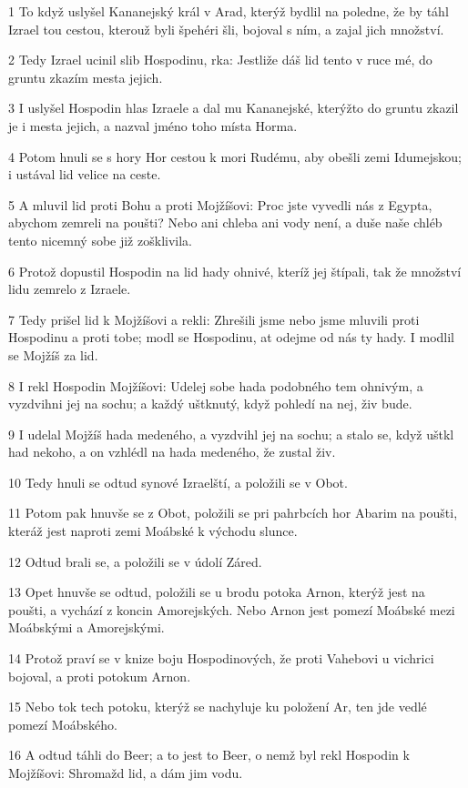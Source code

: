 \par 1 To když uslyšel Kananejský král v Arad, kterýž bydlil na poledne, že by táhl Izrael tou cestou, kterouž byli špehéri šli, bojoval s ním, a zajal jich množství.
\par 2 Tedy Izrael ucinil slib Hospodinu, rka: Jestliže dáš lid tento v ruce mé, do gruntu zkazím mesta jejich.
\par 3 I uslyšel Hospodin hlas Izraele a dal mu Kananejské, kterýžto do gruntu zkazil je i mesta jejich, a nazval jméno toho místa Horma.
\par 4 Potom hnuli se s hory Hor cestou k mori Rudému, aby obešli zemi Idumejskou; i ustával lid velice na ceste.
\par 5 A mluvil lid proti Bohu a proti Mojžíšovi: Proc jste vyvedli nás z Egypta, abychom zemreli na poušti? Nebo ani chleba ani vody není, a duše naše chléb tento nicemný sobe již zošklivila.
\par 6 Protož dopustil Hospodin na lid hady ohnivé, kteríž jej štípali, tak že množství lidu zemrelo z Izraele.
\par 7 Tedy prišel lid k Mojžíšovi a rekli: Zhrešili jsme nebo jsme mluvili proti Hospodinu a proti tobe; modl se Hospodinu, at odejme od nás ty hady. I modlil se Mojžíš za lid.
\par 8 I rekl Hospodin Mojžíšovi: Udelej sobe hada podobného tem ohnivým, a vyzdvihni jej na sochu; a každý uštknutý, když pohledí na nej, živ bude.
\par 9 I udelal Mojžíš hada medeného, a vyzdvihl jej na sochu; a stalo se, když uštkl had nekoho, a on vzhlédl na hada medeného, že zustal živ.
\par 10 Tedy hnuli se odtud synové Izraelští, a položili se v Obot.
\par 11 Potom pak hnuvše se z Obot, položili se pri pahrbcích hor Abarim na poušti, kteráž jest naproti zemi Moábské k východu slunce.
\par 12 Odtud brali se, a položili se v údolí Záred.
\par 13 Opet hnuvše se odtud, položili se u brodu potoka Arnon, kterýž jest na poušti, a vychází z koncin Amorejských. Nebo Arnon jest pomezí Moábské mezi Moábskými a Amorejskými.
\par 14 Protož praví se v knize boju Hospodinových, že proti Vahebovi u vichrici bojoval, a proti potokum Arnon.
\par 15 Nebo tok tech potoku, kterýž se nachyluje ku položení Ar, ten jde vedlé pomezí Moábského.
\par 16 A odtud táhli do Beer; a to jest to Beer, o nemž byl rekl Hospodin k Mojžíšovi: Shromažd lid, a dám jim vodu.
